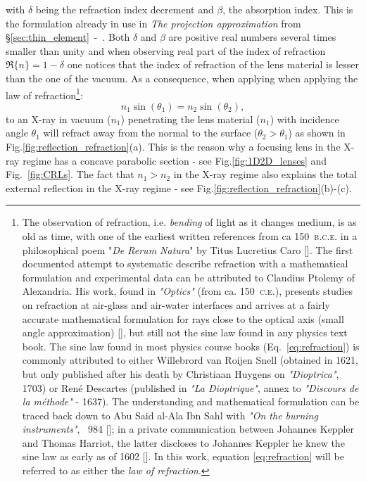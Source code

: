 \begin{refsection}
with $\delta$ being the refraction index decrement and $\beta$, the absorption index. This is the formulation already in use in \textit{The projection approximation} from \S\ref{sec:thin_element}~-~\textit{}. Both $\delta$ and $\beta$ are positive real numbers several times smaller than unity and when observing real part of the index of refraction $\Re\{{n}\}=1-\delta$ one notices that the index of refraction of the lens material is lesser than the one of the vacuum. As a consequence, when applying when applying the law of refraction\footnote{The observation of refraction, i.e. \textit{bending} of light as it changes medium, is as old as time, with one of the earliest written references from ca 150~\textsc{b.c.e.} in a philosophical poem "\textit{De Rerum Natura}" by Titus Lucretius Caro [\cite{Wilk2004}]. The first documented attempt to systematic describe refraction with a mathematical formulation and experimental data can be attributed to Claudius Ptolemy of Alexandria. His work, found in \textit{"Optics"} (from ca. 150~\textsc{c.e.}), presents studies on refraction at air-glass and air-water interfaces and arrives at a fairly accurate mathematical formulation for rays close to the optical axis (small angle approximation) [\cite{Kwan2002}], but still not the sine law found in any physics text book. The sine law found in most physics course books (Eq.~\ref{eq:refraction}) is commonly attributed to either Willebrord van Roijen Snell (obtained in 1621, but only published after his death by Christiaan Huygens on \textit{"Dioptrica"}, 1703) or Ren\'{e} Descartes (published in \textit{"La Dioptrique"}, annex to \textit{"Discours de la m\'{e}thode"} - 1637). The understanding and mathematical formulation can be traced back down to Abu Said al-Ala Ibn Sahl with \textit{"On the burning instruments"}, ~984 [\cite{Rashed1990}]; in a private communication between Johannes Keppler and Thomas Harriot, the latter discloses to Johannes Keppler he knew the sine law as early as of 1602 [\cite{Kwan2002,Lohne1956}]. In this work, equation \ref{eq:refraction} will be referred to as either the \textit{law of refraction}.}:
\begin{equation}\label{eq:refraction}
    n_1\sin(\theta_1)= n_2\sin(\theta_2),
\end{equation}
to an X-ray in vacuum ($n_1$) penetrating the lens material ($n_1$) with incidence angle $\theta_1$ will refract away from the normal to the surface ($\theta_2>\theta_1$) as shown in Fig.\ref{fig:reflection_refraction}(a). This is the reason why a focusing lens in the X-ray regime has a concave parabolic section - see Fig.\ref{fig:1D2D_lenses} and Fig.~\ref{fig:CRLs}. The fact that $n_1>n_2$ in the X-ray regime also explains the total external reflection in the X-ray regime - see Fig.\ref{fig:reflection_refraction}(b)-(c).


\end{refsection}
